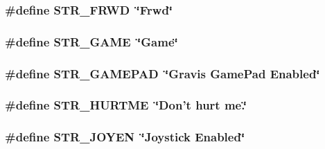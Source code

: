 \label{FOREIGN_8H_abd3a232c8bbf73ee500f7ce9ee855b2f}
\hypertarget{FOREIGN_8H_aa2e6892668bfe6baa97a530cec6278e5}{
\subsubsection[{STR\_\-FRWD}]{\setlength{\rightskip}{0pt plus 5cm}\#define STR\_\-FRWD~\char`\"{}Frwd\char`\"{}}}
\label{FOREIGN_8H_aa2e6892668bfe6baa97a530cec6278e5}
\hypertarget{FOREIGN_8H_a2f4a3d49286aa4868537a71a45ecc850}{
\subsubsection[{STR\_\-GAME}]{\setlength{\rightskip}{0pt plus 5cm}\#define STR\_\-GAME~\char`\"{}Game\char`\"{}}}
\label{FOREIGN_8H_a2f4a3d49286aa4868537a71a45ecc850}
\hypertarget{FOREIGN_8H_a5e81b41eeda9b4b2ae32fc9957fb0dd4}{
\subsubsection[{STR\_\-GAMEPAD}]{\setlength{\rightskip}{0pt plus 5cm}\#define STR\_\-GAMEPAD~\char`\"{}Gravis GamePad Enabled\char`\"{}}}
\label{FOREIGN_8H_a5e81b41eeda9b4b2ae32fc9957fb0dd4}
\hypertarget{FOREIGN_8H_a9a26d5add11d8d720f18048f0bc7f38c}{
\subsubsection[{STR\_\-HURTME}]{\setlength{\rightskip}{0pt plus 5cm}\#define STR\_\-HURTME~\char`\"{}Don't hurt me.\char`\"{}}}
\label{FOREIGN_8H_a9a26d5add11d8d720f18048f0bc7f38c}
\hypertarget{FOREIGN_8H_a9a355ec99e759fcbc938a6db0cecb01c}{
\subsubsection[{STR\_\-JOYEN}]{\setlength{\rightskip}{0pt plus 5cm}\#define STR\_\-JOYEN~\char`\"{}Joystick Enabled\char`\"{}}}
\label{FOREIGN_8H_a9a355ec99e759fcbc938a6db0cecb01c}
